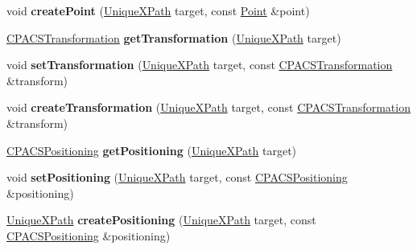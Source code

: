 \begin{DoxyCompactItemize}
\item 
\hypertarget{classcpcr_1_1CPACSFile_a02b49cb35ff5980870045f889a8cc847}{void {\bfseries create\-Point} (\hyperlink{classcpcr_1_1UniqueXPath}{Unique\-X\-Path} target, const \hyperlink{classcpcr_1_1Point}{Point} \&point)}\label{classcpcr_1_1CPACSFile_a02b49cb35ff5980870045f889a8cc847}

\item 
\hypertarget{classcpcr_1_1CPACSFile_aea55fd5327b037543eb154ac18f7833a}{\hyperlink{classcpcr_1_1CPACSTransformation}{C\-P\-A\-C\-S\-Transformation} {\bfseries get\-Transformation} (\hyperlink{classcpcr_1_1UniqueXPath}{Unique\-X\-Path} target)}\label{classcpcr_1_1CPACSFile_aea55fd5327b037543eb154ac18f7833a}

\item 
\hypertarget{classcpcr_1_1CPACSFile_a0577b97dab7e0c548fff2a665aa84dcd}{void {\bfseries set\-Transformation} (\hyperlink{classcpcr_1_1UniqueXPath}{Unique\-X\-Path} target, const \hyperlink{classcpcr_1_1CPACSTransformation}{C\-P\-A\-C\-S\-Transformation} \&transform)}\label{classcpcr_1_1CPACSFile_a0577b97dab7e0c548fff2a665aa84dcd}

\item 
\hypertarget{classcpcr_1_1CPACSFile_ac6e93c6600647839b24f2eebf21b2951}{void {\bfseries create\-Transformation} (\hyperlink{classcpcr_1_1UniqueXPath}{Unique\-X\-Path} target, const \hyperlink{classcpcr_1_1CPACSTransformation}{C\-P\-A\-C\-S\-Transformation} \&transform)}\label{classcpcr_1_1CPACSFile_ac6e93c6600647839b24f2eebf21b2951}

\item 
\hypertarget{classcpcr_1_1CPACSFile_a79e4e2e44058920375c31e4d8fc8408a}{\hyperlink{classcpcr_1_1CPACSPositioning}{C\-P\-A\-C\-S\-Positioning} {\bfseries get\-Positioning} (\hyperlink{classcpcr_1_1UniqueXPath}{Unique\-X\-Path} target)}\label{classcpcr_1_1CPACSFile_a79e4e2e44058920375c31e4d8fc8408a}

\item 
\hypertarget{classcpcr_1_1CPACSFile_a5bef5aa1a031e4a2e69a13addfb876d3}{void {\bfseries set\-Positioning} (\hyperlink{classcpcr_1_1UniqueXPath}{Unique\-X\-Path} target, const \hyperlink{classcpcr_1_1CPACSPositioning}{C\-P\-A\-C\-S\-Positioning} \&positioning)}\label{classcpcr_1_1CPACSFile_a5bef5aa1a031e4a2e69a13addfb876d3}

\item 
\hypertarget{classcpcr_1_1CPACSFile_a3206b6d4c315b7f22b27a19ab4d770a4}{\hyperlink{classcpcr_1_1UniqueXPath}{Unique\-X\-Path} {\bfseries create\-Positioning} (\hyperlink{classcpcr_1_1UniqueXPath}{Unique\-X\-Path} target, const \hyperlink{classcpcr_1_1CPACSPositioning}{C\-P\-A\-C\-S\-Positioning} \&positioning)}\label{classcpcr_1_1CPACSFile_a3206b6d4c315b7f22b27a19ab4d770a4}


\end{DoxyCompactItemize}
